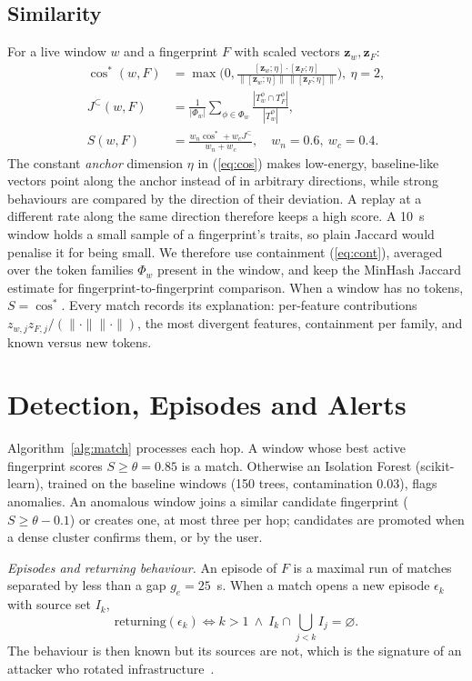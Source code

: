 \documentclass[conference]{IEEEtran}
\begin{document}
\subsection{Similarity}
For a live window $w$ and a fingerprint $F$ with scaled vectors $\mathbf z_w,\mathbf z_F$:
\begin{align}
\cos^{\!*}(w,F)&=\max\!\Big(0,\frac{[\mathbf z_w;\eta]\cdot[\mathbf z_F;\eta]}{\|[\mathbf z_w;\eta]\|\,\|[\mathbf z_F;\eta]\|}\Big),\ \eta=2,\label{eq:cos}\\
J^{\subset}(w,F)&=\frac{1}{|\Phi_w|}\sum_{\phi\in\Phi_w}\frac{|T_w^\phi\cap T_F^\phi|}{|T_w^\phi|},\label{eq:cont}\\
S(w,F)&=\frac{w_n\cos^{\!*}+w_c J^{\subset}}{w_n+w_c},\quad w_n=0.6,\ w_c=0.4.\label{eq:score}
\end{align}
The constant \emph{anchor} dimension $\eta$ in (\ref{eq:cos}) makes low-energy, baseline-like vectors point along the anchor instead of in arbitrary directions, while strong behaviours are compared by the direction of their deviation. A replay at a different rate along the same direction therefore keeps a high score. A 10~s window holds a small sample of a fingerprint's traits, so plain Jaccard would penalise it for being small. We therefore use containment (\ref{eq:cont}), averaged over the token families $\Phi_w$ present in the window, and keep the MinHash Jaccard estimate for fingerprint-to-fingerprint comparison. When a window has no tokens, $S=\cos^{\!*}$. Every match records its explanation: per-feature contributions $z_{w,j}z_{F,j}/(\|\cdot\|\|\cdot\|)$, the most divergent features, containment per family, and known versus new tokens.

\section{Detection, Episodes and Alerts}\label{sec:detect}
Algorithm~\ref{alg:match} processes each hop. A window whose best active fingerprint scores $S\ge\theta=0.85$ is a match. Otherwise an Isolation Forest (scikit-learn), trained on the baseline windows (150 trees, contamination 0.03), flags anomalies. An anomalous window joins a similar candidate fingerprint ($S\ge\theta-0.1$) or creates one, at most three per hop; candidates are promoted when a dense cluster confirms them, or by the user.

\textit{Episodes and returning behaviour.} An episode of $F$ is a maximal run of matches separated by less than a gap $g_e=25$~s. When a match opens a new episode $\epsilon_k$ with source set $I_k$,
\begin{equation}
\mathrm{returning}(\epsilon_k)\iff k>1\ \wedge\ I_k\cap\textstyle\bigcup_{j<k}I_j=\varnothing .\label{eq:ret}
\end{equation}
The behaviour is then known but its sources are not, which is the signature of an attacker who rotated infrastructure~\cite{savage2025,lim2026}.
\end{document}
